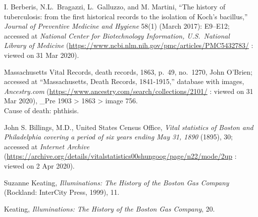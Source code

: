 \begin{thebibliography}{999}
I. Berberis, N.L.\ Bragazzi, L.\ Galluzzo, and M. Martini, ``The history of tuberculosis: from the first historical records to the isolation of Koch's bacillus,'' \textit{Journal of Preventive Medicine and Hygiene} 58(1) (March 2017): E9--E12; accessed at \textit{National Center for Biotechnology Information, U.S.\ National Library of Medicine} (\url{https://www.ncbi.nlm.nih.gov/pmc/articles/PMC5432783/} : viewed on 31 Mar 2020).

Massachusetts Vital Records, death records, 1863, p.\ 49, no.\ 1270, John O'Brien; accessed at ``Massachusetts, Death Records, 1841-1915,'' database with images, \textit{Ancestry.com} (\url{https://www.ancestry.com/search/collections/2101/} : viewed on 31 Mar 2020), \_Pre 1903 > 1863 > image 756.\\
Cause of death: phthisis.

John S. Billings, M.D., United States Census Office, \textit{Vital statistics of Boston and Philadelphia covering a period of six years ending May 31, 1890} (1895), 30; accessed at \textit{Internet Archive} (\url{https://archive.org/details/vitalstatistics00shungoog/page/n22/mode/2up} : viewed on 2 Apr 2020). 

Suzanne Keating, \textit{Illuminations: The History of the Boston Gas Company} (Rockland: InterCity Press, 1999), 11.

Keating, \textit{Illuminations: The History of the Boston Gas Company}, 20.

\end{thebibliography}
